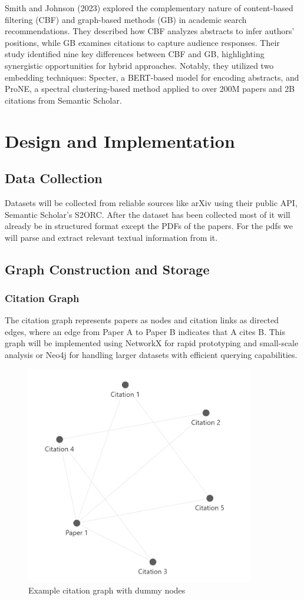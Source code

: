 \documentclass[a4paper,12pt]{article}
\begin{document}
Smith and Johnson (2023) explored the complementary nature of content-based
filtering (CBF) and graph-based methods (GB) in academic search recommendations.
They described how CBF analyzes abstracts to infer authors’ positions, while GB
examines citations to capture audience responses. Their study identified nine key
differences between CBF and GB, highlighting synergistic opportunities for hybrid
approaches. Notably, they utilized two embedding techniques: Specter, a BERT-based
model for encoding abstracts, and ProNE, a spectral clustering-based method applied
to over 200M papers and 2B citations from Semantic Scholar.
\newpage

\section{Design and Implementation}
\subsection{Data Collection}
Datasets will be collected from reliable sources like arXiv using their public API,
Semantic Scholar’s S2ORC. After the dataset has been collected most of it will
already be in structured format except the PDFs of the papers. For the pdfs we will
parse and extract relevant textual information from it.

\subsection{Graph Construction and Storage}
\subsubsection{Citation Graph}
The citation graph represents papers as nodes and citation links as directed edges,
where an edge from Paper A to Paper B indicates that A cites B. This graph will be
implemented using NetworkX for rapid prototyping and small-scale analysis or Neo4j
for handling larger datasets with efficient querying capabilities.
\begin{figure}[H]
    \centering
    \includegraphics[width=10cm]{citationgraph.png}
    \caption{Example citation graph with dummy nodes}
\end{figure}
\end{document}
